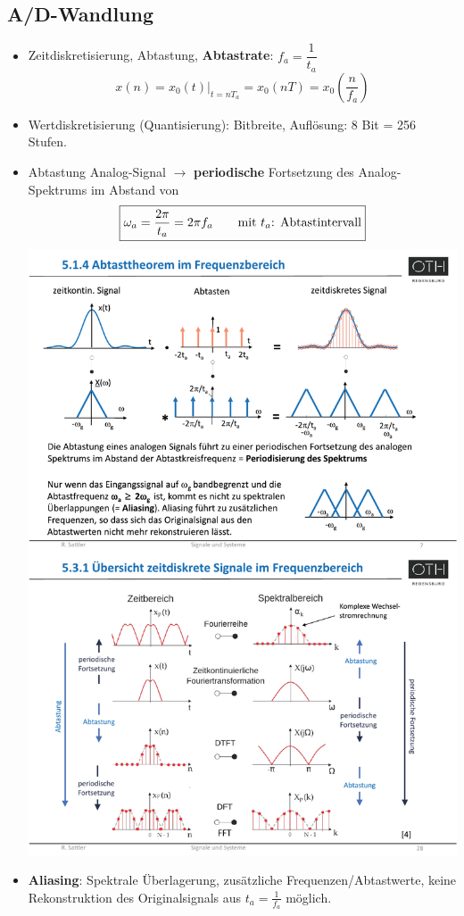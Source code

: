 \subsection{A/D-Wandlung}
\small
\begin{itemize}
	\item Zeitdiskretisierung, Abtastung, \textbf{Abtastrate}: $\boxed{f_a = \dfrac{1}{t_a}}$
	\[
	x(n)= x_0(t)\big|_{t = n{T_a}} = x_0 (nT) = x_0\left(\frac{n}{f_a}\right)
	\]
	\item Wertdiskretisierung (Quantisierung): Bitbreite, Aufl\"osung: 8 Bit = 256 Stufen.
	\item Abtastung Analog-Signal $\rightarrow$ \textbf{periodische} Fortsetzung des Analog-Spektrums im Abstand von $$ \boxed{
	\omega_a=\frac{2\pi}{t_a}=2\pi f_a \text{\qquad mit } t_a\text{: Abtastintervall} }$$
	\includegraphics[width=0.9\columnwidth]{Bilder/Abtastung_Frequenzbereich_Spektrum_Original}
	\item \textbf{Aliasing}: {\small Spektrale \"Uberlagerung, zus\"atzliche Frequenzen/Abtastwerte, keine Rekonstruktion des Originalsignals aus $t_a=\frac{1}{f_a}$ m\"oglich.\\
				
}
\end{itemize}
